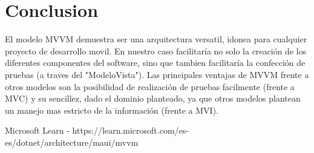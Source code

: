 \documentclass{scrartcl}
\begin{document}
    \section{Conclusion}
        El modelo MVVM demuestra ser una arquitectura versatil, idonea para cualquier proyecto de
         desarrollo movil. En nuestro caso facilitaría no solo la creación de los diferentes
         componentes del software, sino que tambien facilitaría la confección de pruebas (a traves del
         "ModeloVista"). Las principales ventajas de MVVM frente a otros modelos son la posibilidad de
         realización de pruebas facilmente (frente a MVC) y su sencillez, dado el dominio planteado, 
         ya que otros modelos plantean un manejo mas estricto de la información (frente a MVI).
    \newpage
    \begin{thebibliography}{}
         Microsoft Learn - https://learn.microsoft.com/es-es/dotnet/architecture/maui/mvvm
    \end{thebibliography}
\end{document}
